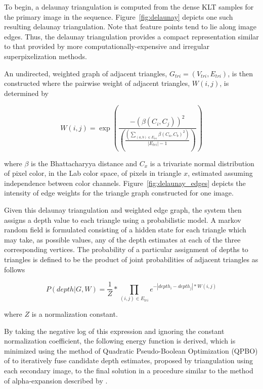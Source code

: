 \documentclass[conference]{acmsiggraph}
\begin{document}
To begin, a delaunay triangulation is computed from the dense KLT samples
for the primary image in the sequence.
Figure~\ref{fig:delaunay} depicts one such resulting delaunay triangulation.
Note that feature points tend to lie along image edges.  Thus, the
delaunay triangulation provides a compact representation similar
to that provided by more computationally-expensive and irregular
superpixelization methods.

An undirected, weighted graph of adjacent triangles,
$G_{tri} = (V_{tri}, E_{tri})$, is then constructed
where the pairwise weight of adjacent triangles, $W(i, j)$, is determined by

\begin{equation}
    W(i, j) = \exp \left(
        \dfrac{-(\beta(C_i, C_j))^2}
        {
            \left(
                \frac{
                    (\sum_{(a, b) \in E_{tri}} \beta(C_a, C_b)^2)
                }
                {
                    |E_{tri}| - 1
                }
            \right)
        }
    \right)
\end{equation}

where $\beta$ is the Bhattacharyya distance \cite{bhattacharyya1946measure}
and $C_x$ is a trivariate normal distribution of pixel color, in the Lab color
space, of pixels in triangle $x$, estimated assuming independence between color
channels. Figure~\ref{fig:delaunay_edges} depicts the intensity of edge weights
for the triangle graph constructed for one image.

Given this delaunay triangulation and weighted edge graph, the system
then assigns a depth value to each triangle using a probabilistic model.
A markov random field is formulated consisting of a hidden state
for each triangle which may take, as possible values, any of the depth
estimates at each of the three corresponding vertices.
The probability of a particular assignment of depths to triangles is
defined to be the product of joint probabilities of adjacent triangles
as follows

\begin{equation}
    \label{eq:mrf}
    P(depth |G, W) = \frac{1}{Z} * \prod_{(i, j) \in E_{tri}}
        e^{-|depth_i - depth_j| * W(i, j)}
\end{equation}

where $Z$ is a normalization constant.

By taking the negative log of this expression
and ignoring the constant normalization coefficient, the
following energy function is derived, which is
minimized using the method of Quadratic Pseudo-Boolean Optimization (QPBO)
of \cite{rother2007optimizing} to iteratively fuse
candidate depth estimates, proposed by triangulation
using each secondary image, to the final solution
in a procedure similar to the method of alpha-expansion
described by \cite{boykov2001fast}.
\end{document}
